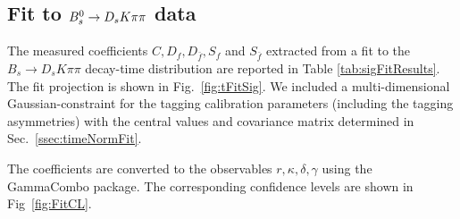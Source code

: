 \subsection{Fit to ${{B}^0_{s}}\rightarrow{\ensuremath{{D}_{s}}}{\ensuremath{K}}{\ensuremath{\pi}}{\ensuremath{\pi}}$ data}
\label{ssec:timeFit}

%
%

The measured \CP coefficients $C,D_{f},D_{\bar{f}},S_{f} $ and $S_{\bar{f}}$ extracted from a 
fit to the $B_s \to D_s K \pi\pi$ decay-time distribution are reported in Table \ref{tab:sigFitResults}.
The fit projection is shown in Fig.~\ref{fig:tFitSig}.
We included a multi-dimensional Gaussian-constraint for the tagging calibration parameters (including the tagging asymmetries) with the central values and covariance matrix determined in Sec.~\ref{ssec:timeNormFit}.

The \CP coefficients are converted to the observables $r,\kappa,\delta,\gamma$ using the GammaCombo package.
The corresponding confidence levels  are shown in Fig~\ref{fig:FitCL}.
\newline
\\

